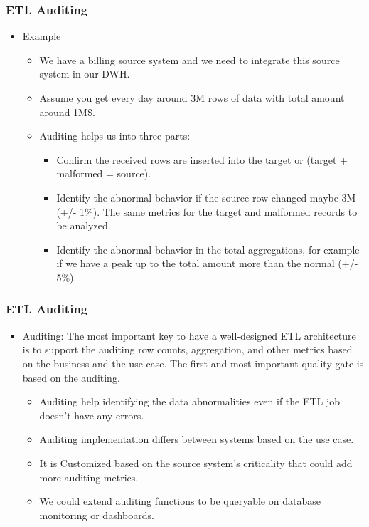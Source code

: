 \begin{frame}
	\frametitle{ETL Auditing}
	\begin{itemize}[<+->]
		\item Example
		\begin{itemize}[<+->]
			\item We have a billing source system and we need to integrate this source system in our DWH.
			\item Assume you get every day around 3M rows of data with total amount around 1M\$.
			\item Auditing helps us into three parts:
			\begin{itemize}[<+->]
				\item Confirm the received rows are inserted into the target or (target + malformed = source).
				\item Identify the abnormal behavior if the source row changed maybe 3M (+/- 1\%). The same metrics for the target and malformed records to be analyzed.
				\item Identify the abnormal behavior in the total aggregations, for example if we have a peak up to the total amount more than the normal (+/- 5\%).
			\end{itemize}
		\end{itemize}
	\end{itemize}
\end{frame}


\begin{frame}
	\frametitle{ETL Auditing}
	\begin{itemize}[<+->]
		\item Auditing: The most important key to have a well-designed ETL architecture is to support the auditing row counts, aggregation, and other metrics based on the business and the use case. The first and most important quality gate is based on the auditing.

		\begin{itemize}[<+->]
			\item Auditing help identifying the data abnormalities even if the ETL job doesn't have any errors.
			\item Auditing implementation differs between systems based on the use case.
			\item It is Customized based on the source system's criticality that could add more auditing metrics.
			\item We could extend auditing functions to be queryable on database monitoring or dashboards.


		\end{itemize}
	\end{itemize}
\end{frame}



